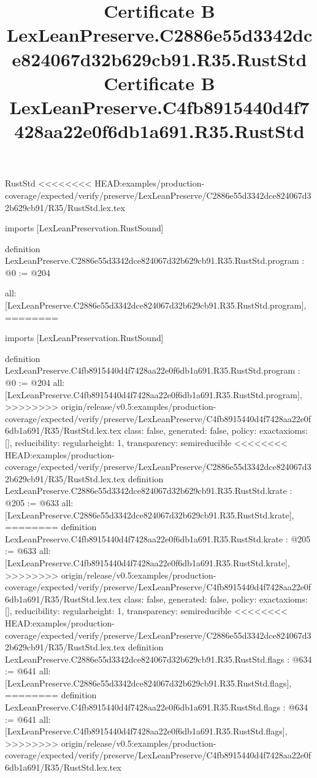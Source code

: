 \begin{lexlean}{RustStd}
<<<<<<<< HEAD:examples/production-coverage/expected/verify/preserve/LexLeanPreserve/C2886e55d3342dce824067d32b629cb91/R35/RustStd.lex.tex
\title{Certificate B LexLeanPreserve.C2886e55d3342dce824067d32b629cb91.R35.RustStd}
\begin{coremodule}
imports [LexLeanPreservation.RustSound]

definition LexLeanPreserve.C2886e55d3342dce824067d32b629cb91.R35.RustStd.program : @0 := @204 {
  all: [LexLeanPreserve.C2886e55d3342dce824067d32b629cb91.R35.RustStd.program],
========
\title{Certificate B LexLeanPreserve.C4fb8915440d4f7428aa22e0f6db1a691.R35.RustStd}
\begin{coremodule}
imports [LexLeanPreservation.RustSound]

definition LexLeanPreserve.C4fb8915440d4f7428aa22e0f6db1a691.R35.RustStd.program : @0 := @204 {
  all: [LexLeanPreserve.C4fb8915440d4f7428aa22e0f6db1a691.R35.RustStd.program],
>>>>>>>> origin/release/v0.5:examples/production-coverage/expected/verify/preserve/LexLeanPreserve/C4fb8915440d4f7428aa22e0f6db1a691/R35/RustStd.lex.tex
  class: false,
  generated: false,
  policy: exact{axioms: []},
  reducibility: regular{height: 1},
  transparency: semireducible
}
<<<<<<<< HEAD:examples/production-coverage/expected/verify/preserve/LexLeanPreserve/C2886e55d3342dce824067d32b629cb91/R35/RustStd.lex.tex
definition LexLeanPreserve.C2886e55d3342dce824067d32b629cb91.R35.RustStd.krate : @205 := @633 {
  all: [LexLeanPreserve.C2886e55d3342dce824067d32b629cb91.R35.RustStd.krate],
========
definition LexLeanPreserve.C4fb8915440d4f7428aa22e0f6db1a691.R35.RustStd.krate : @205 := @633 {
  all: [LexLeanPreserve.C4fb8915440d4f7428aa22e0f6db1a691.R35.RustStd.krate],
>>>>>>>> origin/release/v0.5:examples/production-coverage/expected/verify/preserve/LexLeanPreserve/C4fb8915440d4f7428aa22e0f6db1a691/R35/RustStd.lex.tex
  class: false,
  generated: false,
  policy: exact{axioms: []},
  reducibility: regular{height: 1},
  transparency: semireducible
}
<<<<<<<< HEAD:examples/production-coverage/expected/verify/preserve/LexLeanPreserve/C2886e55d3342dce824067d32b629cb91/R35/RustStd.lex.tex
definition LexLeanPreserve.C2886e55d3342dce824067d32b629cb91.R35.RustStd.flags : @634 := @641 {
  all: [LexLeanPreserve.C2886e55d3342dce824067d32b629cb91.R35.RustStd.flags],
========
definition LexLeanPreserve.C4fb8915440d4f7428aa22e0f6db1a691.R35.RustStd.flags : @634 := @641 {
  all: [LexLeanPreserve.C4fb8915440d4f7428aa22e0f6db1a691.R35.RustStd.flags],
>>>>>>>> origin/release/v0.5:examples/production-coverage/expected/verify/preserve/LexLeanPreserve/C4fb8915440d4f7428aa22e0f6db1a691/R35/RustStd.lex.tex
}}}
\end{coremodule}}
\end{coremodule}
\end{lexlean}
